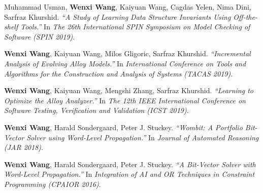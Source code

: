 \begin{thebibliography}{99}
	Muhammad Usman, \textbf{Wenxi Wang}, Kaiyuan Wang, Cagdas Yelen, Nima Dini, Sarfraz Khurshid.
	\emph{``A Study of Learning Data Structure Invariants Using Off-the-shelf Tools.''}
	In \textit{The 26th International SPIN Symposium on Model Checking of Software (SPIN 2019)}. \href{https://wenxiwang.github.io/papers/spin2019.pdf}{\color{color1}{\textbf{[PDF]}}}
	
	\textbf{Wenxi Wang}, Kaiyuan Wang, Milos Gligoric, Sarfraz Khurshid.
	\emph{``Incremental Analysis of Evolving Alloy Models.''}
	In \textit{International Conference on Tools and Algorithms for the Construction and Analysis of Systems (TACAS 2019)}. \href{https://wenxiwang.github.io/papers/incrementalAlloy.pdf}{\color{color1}{\textbf{[PDF]}}}
	
	\textbf{Wenxi Wang}, Kaiyuan Wang, Mengshi Zhang, Sarfraz Khurshid.
	\emph{``Learning to Optimize the Alloy Analyzer.''}
	In \textit{The 12th IEEE International Conference on Software Testing, Verification and Validation (ICST 2019)}. \href{https://wenxiwang.github.io/papers/Learning_to_Optimize_the_Alloy_Analyzer.pdf}{\color{color1}{\textbf{[PDF]}}}
	
	\textbf{Wenxi Wang}, Harald Sondergaard, Peter J. Stuckey.
	\emph{``Wombit: A Portfolio Bit-Vector Solver using Word-Level Propagation.''}
	In \textit{Journal of Automated Reasoning (JAR 2018)}. \href{https://wenxiwang.github.io/papers/Wombit.pdf}{\color{color1}{\textbf{[PDF]}}}
	
	\textbf{Wenxi Wang}, Harald Sondergaard, Peter J. Stuckey.
	\emph{``A Bit-Vector Solver with Word-Level Propagation.''}
	In \textit{Integration of AI and OR Techniques in Constraint Programming (CPAIOR 2016)}. \href{https://wenxiwang.github.io/papers/cpaior2016.pdf}{\color{color1}{\textbf{[PDF]}}}
	
	
\end{thebibliography}






